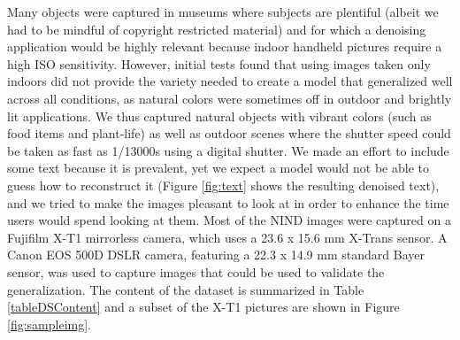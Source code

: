\begin{table}
{}
\caption{Dataset content}
\label{tableDSContent}
\end{table}

Many objects were captured in museums where subjects are plentiful (albeit we had to be mindful of copyright restricted material) and for which a denoising application would be highly relevant because indoor handheld pictures require a high ISO sensitivity. However, initial tests found that using images taken only indoors did not provide the variety needed to create a model that generalized well across all conditions, as natural colors were sometimes off in outdoor and brightly lit applications. We thus captured natural objects with vibrant colors (such as food items and plant-life) as well as outdoor scenes where the shutter speed could be taken as fast as 1/13000s using a digital shutter. We made an effort to include some text because it is prevalent, yet we expect a model would not be able to guess how to reconstruct it (Figure \ref{fig:text} shows the resulting denoised text), and we tried to make the images pleasant to look at in order to enhance the time users would spend looking at them. Most of the NIND images were captured on a Fujifilm X-T1 mirrorless camera, which uses a 23.6 x 15.6 mm X-Trans sensor. A Canon EOS 500D DSLR camera, featuring a 22.3 x 14.9 mm standard Bayer sensor, was used to capture images that could be used to validate the generalization. The content of the dataset is summarized in Table \ref{tableDSContent} and a subset of the X-T1 pictures are shown in Figure \ref{fig:sampleimg}.
